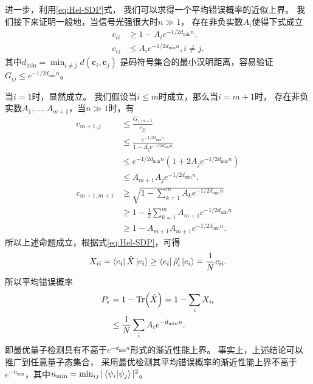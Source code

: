 进一步，利用\ref{eq:Hel-SDP}式，
我们可以求得一个平均错误概率的近似上界。
我们接下来证明一般地，当信号光强很大时$n \gg 1$，
存在非负实数$A_i$使得下式成立
\begin{equation}
\begin{split}
c_{ii} & \ge 1 - A_i e^{-1/2 d_{\min} n}, \\
c_{ij} & \le A_i e^{-1/2 d_{\min} n}, i\neq j.
\end{split}
\end{equation}
其中$d_{\min} = \min_{i \neq j} d(\bm{c}_i , \bm{c}_j)$
是码符号集合的最小汉明距离，容易验证$G_{ij} \le e^{-1/2 d_{\min} n}$。

当$i=1$时，显然成立。
我们假设当$i\le m$时成立，那么当$i=m+1$时，
存在非负实数$A_1, ..., A_{m+1}$，当$n \gg 1$时，有
\begin{equation}
\begin{split}
c_{m+1,j} & \le \frac{G_{j,m+1}}{c_{jj}} \\
       & \le \frac{e^{-1/2 d_{\min} n}}{1 - A_j e^{-1/2 d_{\min} n}}   \\
       & \le e^{-1/2 d_{\min} n} \left(  1 + 2 A_j e^{-1/2 d_{\min} n} \right)  \\
       & \le A_{m+1} A_j e^{-1/2 d_{\min} n}. \\
c_{m+1,m+1} &\ge \sqrt{1 - \sum_{k=1}^{m} A_k e^{-1/2 d_{\min} n} } \\
            &\ge 1 - \frac{1}{2}\sum_{k=1}^{m} A_{m+1} e^{-1/2 d_{\min} n} \\
            &\ge 1 - A_{m+1} A_{m+1} e^{-1/2 d_{\min} n}.
\end{split}
\end{equation}
所以上述命题成立，根据式\ref{eq:Hel-SDP}，可得
\begin{equation}
\begin{split}
X_{ii} = \bra{e_i} \hat{X} \ket{e_i} \ge \bra{e_i} \hat{\rho}_i' \ket{e_i} = \frac{1}{N} c_{ii}  .
\end{split}
\end{equation}
所以平均错误概率
\begin{equation}
\begin{split}
P_e &= 1 - \Tr(\hat{X}) =  1 - \sum_i X_{ii} \\
    &\le \frac{1}{N} \sum_i A_i e^{- d_{\min} n}.
\end{split}
\end{equation}
即最优量子检测具有不高于$e^{- d_{\min} n}$形式的渐近性能上界。
事实上，上述结论可以推广到任意量子态集合，
采用最优检测其平均错误概率的渐近性能上界不高于
$e^{-n_{\min}}$，其中$n_{\min} = \min_{ij} |\bra{\psi_i}\ket{\psi_j}|^2$。

